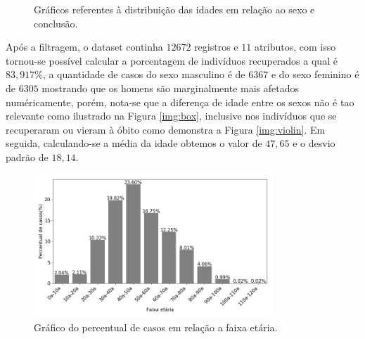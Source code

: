 \documentclass[12pt]{article}
\begin{document}
\begin{figure}[ht]
	\centering
	\hfill 
	\hfill
	\hfill
			\caption{Gráficos referentes à distribuição das idades em relação ao sexo e conclusão.}
\end{figure}

Após a filtragem, o dataset continha $12672$ registros e $11$ atributos, com isso tornou-se possível calcular a porcentagem de indivíduos recuperados a qual é $83,917\%$, a quantidade de casos do sexo masculino é de $6367$ e do sexo feminino é de $6305$ mostrando que os homens são marginalmente mais afetados numéricamente, porém, nota-se que a diferença de idade entre os sexos não é tao relevante como ilustrado na Figura \ref{img:box}, inclusive nos indivíduos que se recuperaram ou vieram à óbito como demonstra a Figura \ref{img:violin}. Em seguida, calculando-se a média da idade obtemos o valor de $47,65$ e o desvio padrão de $18,14$.

\begin{figure}[h!]
    \centering
    \includegraphics[width=0.8\textwidth]{barplot_faixa.png}
    \caption{Gráfico do percentual de casos em relação a faixa etária.}
    \label{fig:faixa_etaria}
\end{figure}
\end{document}

